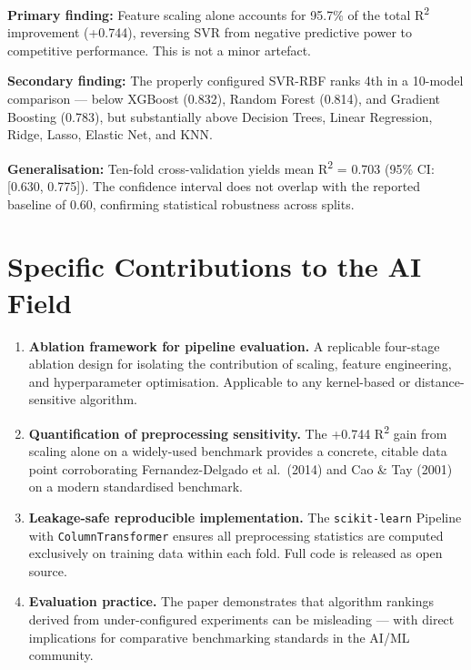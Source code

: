 \documentclass[12pt,a4paper]{article}
\begin{document}
\textbf{Primary finding:} Feature scaling alone accounts for 95.7\% of the total
R\textsuperscript{2} improvement (+0.744), reversing SVR from negative predictive
power to competitive performance. This is not a minor artefact.

\textbf{Secondary finding:} The properly configured SVR-RBF ranks 4th in a 10-model
comparison --- below XGBoost (0.832), Random Forest (0.814), and Gradient Boosting
(0.783), but substantially above Decision Trees, Linear Regression, Ridge, Lasso,
Elastic Net, and KNN.

\textbf{Generalisation:} Ten-fold cross-validation yields mean R\textsuperscript{2} =
0.703 (95\% CI: [0.630, 0.775]). The confidence interval does not overlap with the
reported baseline of 0.60, confirming statistical robustness across splits.

\section{Specific Contributions to the AI Field}

\begin{enumerate}[leftmargin=1.8em]
  \item \textbf{Ablation framework for pipeline evaluation.} A replicable four-stage
        ablation design for isolating the contribution of scaling, feature engineering,
        and hyperparameter optimisation. Applicable to any kernel-based or
        distance-sensitive algorithm.

  \item \textbf{Quantification of preprocessing sensitivity.} The +0.744 R\textsuperscript{2}
        gain from scaling alone on a widely-used benchmark provides a concrete,
        citable data point corroborating Fernandez-Delgado et al.\ (2014) and
        Cao \& Tay (2001) on a modern standardised benchmark.

  \item \textbf{Leakage-safe reproducible implementation.} The \texttt{scikit-learn}
        Pipeline with \texttt{ColumnTransformer} ensures all preprocessing statistics
        are computed exclusively on training data within each fold. Full code is
        released as open source.

  \item \textbf{Evaluation practice.} The paper demonstrates that algorithm rankings
        derived from under-configured experiments can be misleading --- with direct
        implications for comparative benchmarking standards in the AI/ML community.
\end{enumerate}
\end{document}
